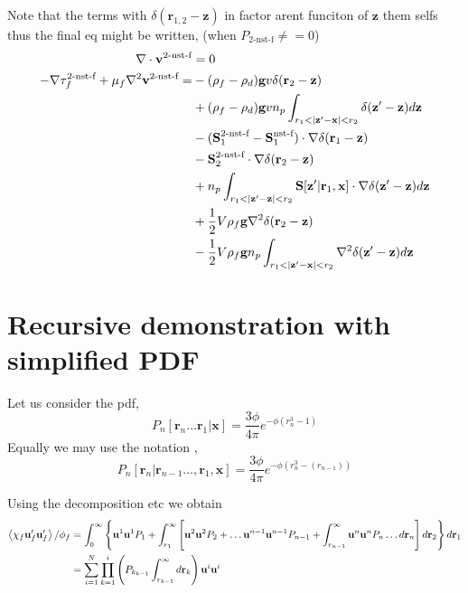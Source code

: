 Note that the terms with $\delta(\textbf{r}_{1,2} - \textbf{z})$ in factor arent funciton of $\textbf{z}$ them selfs thus the final eq might be written, (when $P_\text{2-nst-f}\neq =0$)
\begin{align}
     \div \textbf{v}^\text{2-nst-f} &= 0 \\
    - \grad\tau_f^\text{2-nst-f} 
    +\mu_f \grad^2\textbf{v}^\text{2-nst-f}
    = 
    &- (\rho_f - \rho_d) \textbf{g} v \delta(\textbf{r}_2 - \textbf{z}) \\
    &+ (\rho_f - \rho_d) \textbf{g} v n_p \int_{r_1<|\textbf{z}' - \textbf{x}| <r_2} \delta(\textbf{z}'-\textbf{z})d\textbf{z} \\
    &-  (\textbf{S}_{1}^\text{2-nst-f} - \textbf{S}_{1}^\text{nst-f})  \cdot \grad \delta(\textbf{r}_1 - \textbf{z}) \\
    &-  \textbf{S}_2^\text{2-nst-f}  \cdot \grad \delta(\textbf{r}_2 - \textbf{z}) \\
    &+  n_p \int_{r_1 < |\textbf{z}' - \textbf{z}|<r_2}\textbf{S}[\textbf{z}'|\textbf{r}_1,\textbf{x}] \cdot \grad\delta(\textbf{z}'-\textbf{z}) d\textbf{z}\\
    &+ \frac{1}{2} V \rho_f \textbf{g}\grad^2\delta(\textbf{r}_2 - \textbf{z}) \\
    &- \frac{1}{2} V \rho_f \textbf{g} n_p \int_{r_1<|\textbf{z}' - \textbf{x}| <r_2} \grad^2\delta(\textbf{z}'-\textbf{z})d\textbf{z} \\
\end{align}


\section{Recursive demonstration with simplified PDF}
Let us consider the pdf, 
\begin{equation}
    P_n [\textbf{r}_n \ldots \textbf{r}_1|\textbf{x}]
    = 
    \frac{3\phi}{4\pi} e^{-\phi (r_n^3 -  1)}
\end{equation}
Equally we may use the notation , 
\begin{equation}
    P_n [\textbf{r}_n | \textbf{r}_{n-1} \ldots, \textbf{r}_1, \textbf{x}]
    = 
    \frac{3\phi}{4\pi} e^{-\phi (r_n^3 -  (r_{n-1}))}
\end{equation}

Using the decomposition etc we obtain 
\begin{align}
    \left<\chi_f \textbf{u}_f'\textbf{u}_f'\right>/ \phi_f
    &=
    \int_{0}^{\infty}
    \left\{
        \textbf{u}^1
        \textbf{u}^1
        P_1 
        +
        \int_{r_1}^{\infty}
        \left[
        \textbf{u}^2
        \textbf{u}^2
        P_2 
        + \ldots
        \textbf{u}^{n-1}
        \textbf{u}^{n-1}
        P_{n-1}
        + 
        \int_{r_{n-1}}^{\infty}
        \textbf{u}^n
        \textbf{u}^n
        P_n
        \ldots
        d\textbf{r}_n 
        \right]
        d\textbf{r}_2
    \right\}
    d\textbf{r}_1 \\
    &=
    \sum_{i=1}^N 
    \prod_{k=1}^i \left(
        P_{k_{k-1}}
        \int_{r_{k-1}}^{\infty}
        d\textbf{r}_k 
    \right)
    \textbf{u}^i
    \textbf{u}^i
\end{align}


